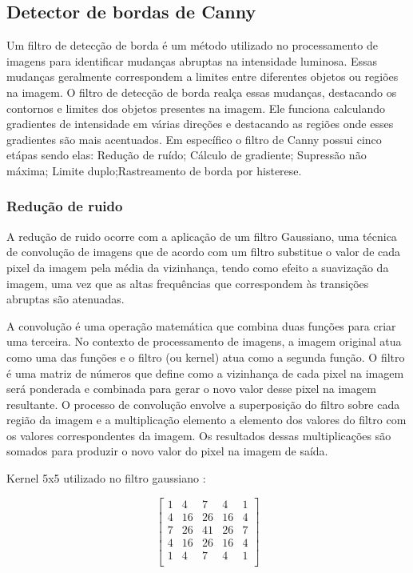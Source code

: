\subsection[Detector de bordas de Canny]{Detector de bordas de Canny}\label{sec:Detector de bordas de Canny}

Um filtro de detecção de borda é um método utilizado no processamento de imagens para identificar mudanças abruptas na intensidade luminosa. Essas mudanças geralmente correspondem a limites entre diferentes objetos ou regiões na imagem. O filtro de detecção de borda realça essas mudanças, destacando os contornos e limites dos objetos presentes na imagem. Ele funciona calculando gradientes de intensidade em várias direções e destacando as regiões onde esses gradientes são mais acentuados. Em específico o filtro de Canny possui cinco etápas sendo elas: Redução de ruído; Cálculo de gradiente; Supressão não máxima; Limite duplo;Rastreamento de borda por histerese\cite{canny-edge-detection-python}.


\subsubsection[Redução de ruido]{Redução de ruido}
A redução de ruido ocorre com a aplicação de um filtro Gaussiano, uma técnica de convolução de imagens que de acordo com um filtro substitue o valor de cada pixel da imagem pela média da vizinhança, tendo como efeito a suavização da imagem, uma vez que as altas frequências que correspondem às transições abruptas são atenuadas\cite{filtroGaus}.

A convolução é uma operação matemática que combina duas funções para criar uma terceira. No contexto de processamento de imagens, a imagem original atua como uma das funções e o filtro (ou kernel) atua como a segunda função. O filtro é uma matriz de números que define como a vizinhança de cada pixel na imagem será ponderada e combinada para gerar o novo valor desse pixel na imagem resultante. O processo de convolução envolve a superposição do filtro sobre cada região da imagem e a multiplicação elemento a elemento dos valores do filtro com os valores correspondentes da imagem. Os resultados dessas multiplicações são somados para produzir o novo valor do pixel na imagem de saída\cite{convolucao}.

Kernel 5x5 utilizado no filtro gaussiano \cite{kernel_gaus}:

\[
    \begin{bmatrix}
        1 & 4 & 7 & 4 & 1 \\
        4 & 16 & 26 & 16 & 4 \\
        7 & 26 & 41 & 26 & 7 \\
        4 & 16 & 26 & 16 & 4 \\
        1 & 4 & 7 & 4 & 1 \\
    \end{bmatrix}
\]


